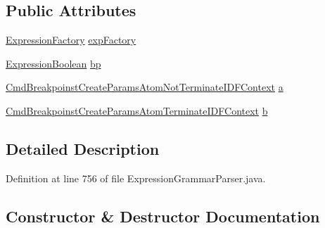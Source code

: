 \subsection*{Public Attributes}
\begin{DoxyCompactItemize}
\item 
\hyperlink{classgov_1_1nasa_1_1jpf_1_1inspector_1_1server_1_1expression_1_1_expression_factory}{Expression\+Factory} \hyperlink{classgov_1_1nasa_1_1jpf_1_1inspector_1_1server_1_1expression_1_1parser_1_1_expression_grammar_paa3acc222754f42ff002c5d98d8d38136_adb23e6d9ce49bb3c885710e9b54f5bb8}{exp\+Factory}
\item 
\hyperlink{classgov_1_1nasa_1_1jpf_1_1inspector_1_1server_1_1expression_1_1_expression_boolean}{Expression\+Boolean} \hyperlink{classgov_1_1nasa_1_1jpf_1_1inspector_1_1server_1_1expression_1_1parser_1_1_expression_grammar_paa3acc222754f42ff002c5d98d8d38136_a85dffcff532580ad4b2ff13bdb90763a}{bp}
\item 
\hyperlink{classgov_1_1nasa_1_1jpf_1_1inspector_1_1server_1_1expression_1_1parser_1_1_expression_grammar_paee196826319d0ea00470866a7ffd8d7b}{Cmd\+Breakpoinst\+Create\+Params\+Atom\+Not\+Terminate\+I\+D\+F\+Context} \hyperlink{classgov_1_1nasa_1_1jpf_1_1inspector_1_1server_1_1expression_1_1parser_1_1_expression_grammar_paa3acc222754f42ff002c5d98d8d38136_a2a8c8b5f5d90b0e550cb9222bfdb4ce8}{a}
\item 
\hyperlink{classgov_1_1nasa_1_1jpf_1_1inspector_1_1server_1_1expression_1_1parser_1_1_expression_grammar_pa33db42909734e187834b73b54c5beb59}{Cmd\+Breakpoinst\+Create\+Params\+Atom\+Terminate\+I\+D\+F\+Context} \hyperlink{classgov_1_1nasa_1_1jpf_1_1inspector_1_1server_1_1expression_1_1parser_1_1_expression_grammar_paa3acc222754f42ff002c5d98d8d38136_a352c87188e3354d0a0b8626198890912}{b}
\end{DoxyCompactItemize}


\subsection{Detailed Description}


Definition at line 756 of file Expression\+Grammar\+Parser.\+java.



\subsection{Constructor \& Destructor Documentation}
